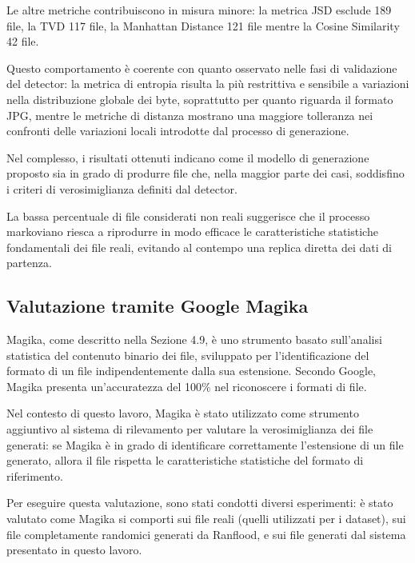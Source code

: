 \documentclass{report}
\begin{document}
Le altre metriche contribuiscono in misura minore:
la metrica JSD esclude 189 file, la TVD 117 file, la Manhattan Distance 121 file
mentre la Cosine Similarity 42 file.

\bigskip

Questo comportamento è coerente con quanto osservato nelle fasi di validazione
del detector: la metrica di entropia risulta la più restrittiva e sensibile a
variazioni nella distribuzione globale dei byte, soprattutto per quanto riguarda il formato JPG,
mentre le metriche di distanza mostrano una maggiore tolleranza nei confronti delle variazioni locali
introdotte dal processo di generazione.

\bigskip

Nel complesso, i risultati ottenuti indicano come il modello di generazione proposto sia in grado
di produrre file che, nella maggior parte dei casi, soddisfino i criteri di verosimiglianza
definiti dal detector.

La bassa percentuale di file considerati non reali suggerisce che il processo markoviano riesca a
riprodurre in modo efficace le caratteristiche statistiche fondamentali dei file
reali, evitando al contempo una replica diretta dei dati di partenza.


\subsection{Valutazione tramite Google Magika}

Magika, come descritto nella Sezione 4.9, è uno strumento basato sull'analisi statistica del contenuto binario
dei file, sviluppato per l'identificazione del formato di un file indipendentemente dalla sua estensione. 
Secondo Google, Magika presenta un'accuratezza del 100\% nel riconoscere i formati di file.

Nel contesto di questo lavoro, Magika è stato utilizzato come strumento aggiuntivo al sistema di rilevamento
per valutare la verosimiglianza dei file generati: se Magika è in grado di identificare correttamente l'estensione
di un file generato, allora il file rispetta le caratteristiche statistiche del formato di riferimento.

\bigskip

Per eseguire questa valutazione, sono stati condotti diversi esperimenti:
è stato valutato come Magika si comporti sui file reali (quelli utilizzati per i dataset), sui file 
completamente randomici generati da Ranflood, e sui file generati dal sistema presentato in questo lavoro.
\end{document}
